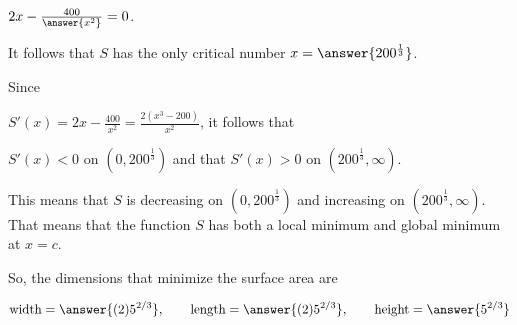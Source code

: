 \documentclass{ximera}
\begin{document}
\begin{exercise}
\begin{hint}
  $2x-\frac{400}{\answer{x^2}}=0$.
  
  It follows that $S$ has the only critical number  $x=\answer{200^{\frac{1}{3}}}$.
    \end{hint}
  
     \begin{hint}
     Since
    
     $S'(x)=2x-\frac{400}{x^{2}}=\frac{2(x^{3}-200)}{x^{2}}$, it follows that
    
      $S'(x)<0$ on $(0, 200^{\frac{1}{3}})$ and  that $S'(x)>0$ on $(200^{\frac{1}{3}},\infty)$.
     
      This means that $S$ is decreasing on $(0, 200^{\frac{1}{3}})$ and increasing on $(200^{\frac{1}{3}},\infty)$.
      That means that the function $S$ has both a local minimum and global minimum at $x=c$.
 \end{hint}
   


  So, the dimensions that minimize the surface area are
  
  \begin{prompt}
  \[
  \text{width}=\answer{(2) 5^{2/3}},\qquad
  \text{length}=\answer{(2) 5^{2/3}},\qquad
  \text{height}=\answer{5^{2/3}}
  \]
  \end{prompt}
\end{exercise}
\end{document}
